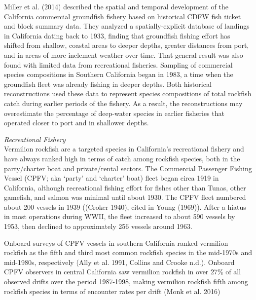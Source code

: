 \documentclass[11pt,
  english,
]{article}
\begin{document}
Miller et al. {(2014)\leavevmode\tagmcend\tagstructend} described the spatial and temporal development of the California commercial groundfish fishery based on historical CDFW fish ticket and block summary data. They analyzed a spatially-explicit database of landings in California dating back to 1933, finding that groundfish fishing effort has shifted from shallow, coastal areas to deeper depths, greater distances from port, and in areas of more inclement weather over time. That general result was also found with limited data from recreational fisheries. Sampling of commercial species compositions in Southern California began in 1983, a time when the groundfish fleet was already fishing in deeper depths. Both historical reconstructions used these data to represent species compositions of total rockfish catch during earlier periods of the fishery. As a result, the reconstructions may overestimate the percentage of deep-water species in earlier fisheries that operated closer to port and in shallower depths.

\emph{Recreational Fishery}\\
Vermilion rockfish are a targeted species in California's recreational fishery and have always ranked high in terms of catch among rockfish species, both in the party/charter boat and private/rental sectors. The Commercial Passenger Fishing Vessel (CPFV; aka `party' and `charter' boat) fleet began circa 1919 in California, although recreational fishing effort for fishes other than Tunas, other gamefish, and salmon was minimal until about 1930. The CPFV fleet numbered about 200 vessels in 1939 ({(Croker 1940)\leavevmode\tagmcend\tagstructend}, cited in Young {(1969)\leavevmode\tagmcend\tagstructend}). After a hiatus in most operations during WWII, the fleet increased to about 590 vessels by 1953, then declined to approximately 256 vessels around 1963.

Onboard surveys of CPFV vessels in southern California ranked vermilion rockfish as the fifth and third most common rockfish species in the mid-1970s and mid-1980s, respectively {(Ally et al. 1991, Collins and Crooke n.d.)\leavevmode\tagmcend\tagstructend}. Onboard CPFV observers in central California saw vermilion rockfish in over 27\% of all observed drifts over the period 1987-1998, making vermilion rockfish fifth among rockfish species in terms of encounter rates per drift {(Monk et al. 2016)\leavevmode\tagmcend\tagstructend}
\end{document}
